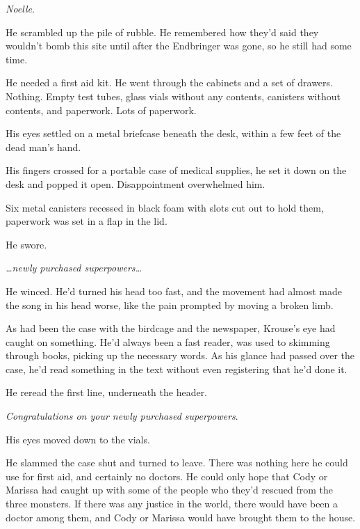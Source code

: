 \emph{Noelle}.



He scrambled up the pile of rubble.  He remembered how they'd said they wouldn't bomb this site until after the Endbringer was gone, so he still had some time.



He needed a first aid kit.  He went through the cabinets and a set of drawers.  Nothing.  Empty test tubes, glass vials without any contents, canisters without contents, and paperwork.  Lots of paperwork.



His eyes settled on a metal briefcase beneath the desk, within a few feet of the dead man's hand.



His fingers crossed for a portable case of medical supplies, he set it down on the desk and popped it open.  Disappointment overwhelmed him.



Six metal canisters recessed in black foam with slots cut out to hold them, paperwork was set in a flap in the lid.



He swore.



\emph{\ldots{}newly purchased superpowers\ldots}



He winced.  He'd turned his head too fast, and the movement had almost made the song in his head worse, like the pain prompted by moving a broken limb.



As had been the case with the birdcage and the newspaper, Krouse's eye had caught on something.  He'd always been a fast reader, was used to skimming through books, picking up the necessary words.  As his glance had passed over the case, he'd read something in the text without even registering that he'd done it.



He reread the first line, underneath the header.



\emph{Congratulations on your newly purchased superpowers}.



His eyes moved down to the vials.



He slammed the case shut and turned to leave.  There was nothing here he could use for first aid, and certainly no doctors.  He could only hope that Cody or Marissa had caught up with some of the people who they'd rescued from the three monsters.  If there was any justice in the world, there would have been a doctor among them, and Cody or Marissa would have brought them to the house.



